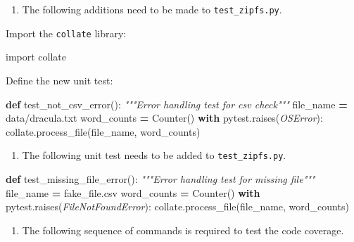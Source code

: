 \documentclass[
]{krantz}
\makeatletter
\newenvironment{Shaded}{\begin{snugshade}}{\end{snugshade}}
\newcommand{\CommentTok}[1]{\textcolor[rgb]{0.56,0.35,0.01}{\textit{#1}}}
\newcommand{\ControlFlowTok}[1]{\textcolor[rgb]{0.13,0.29,0.53}{\textbf{#1}}}
\newcommand{\ImportTok}[1]{#1}
\newcommand{\KeywordTok}[1]{\textcolor[rgb]{0.13,0.29,0.53}{\textbf{#1}}}
\newcommand{\NormalTok}[1]{#1}
\newcommand{\OperatorTok}[1]{\textcolor[rgb]{0.81,0.36,0.00}{\textbf{#1}}}
\newcommand{\PreprocessorTok}[1]{\textcolor[rgb]{0.56,0.35,0.01}{\textit{#1}}}
\newcommand{\StringTok}[1]{\textcolor[rgb]{0.31,0.60,0.02}{#1}}
\providecommand{\tightlist}{%
  \setlength{\itemsep}{0pt}\setlength{\parskip}{0pt}}
\newenvironment{kframe}{%
\medskip{}
\setlength{\fboxsep}{.8em}
 \def\at@end@of@kframe{}%
 \ifinner\ifhmode%
  \def\at@end@of@kframe{\end{minipage}}%
  \begin{minipage}{\columnwidth}%
 \fi\fi%
 \def\FrameCommand##1{\hskip\@totalleftmargin \hskip-\fboxsep
 \colorbox{shadecolor}{##1}\hskip-\fboxsep
     \hskip-\linewidth \hskip-\@totalleftmargin \hskip\columnwidth}%
 \MakeFramed {\advance\hsize-\width
   \@totalleftmargin\z@ \linewidth\hsize
   \@setminipage}}%
 {\par\unskip\endMakeFramed%
 \at@end@of@kframe}
\renewenvironment{Shaded}{\begin{kframe}}{\end{kframe}}
\makeatother
\begin{document}
\begin{enumerate}
\def\labelenumi{\arabic{enumi}.}
\setcounter{enumi}{1}
\tightlist
\item
  The following additions need to be made to \texttt{test\_zipfs.py}.
\end{enumerate}

Import the \texttt{collate} library:

\begin{Shaded}
\begin{Highlighting}[]
\ImportTok{import}\NormalTok{ collate}
\end{Highlighting}
\end{Shaded}

Define the new unit test:

\begin{Shaded}
\begin{Highlighting}[]
\KeywordTok{def}\NormalTok{ test\_not\_csv\_error():}
    \CommentTok{"""Error handling test for csv check"""}
\NormalTok{    file\_name }\OperatorTok{=} \StringTok{\textquotesingle{}data/dracula.txt\textquotesingle{}}
\NormalTok{    word\_counts }\OperatorTok{=}\NormalTok{ Counter()}
    \ControlFlowTok{with}\NormalTok{ pytest.raises(}\PreprocessorTok{OSError}\NormalTok{):}
\NormalTok{        collate.process\_file(file\_name, word\_counts)}
\end{Highlighting}
\end{Shaded}

\begin{enumerate}
\def\labelenumi{\arabic{enumi}.}
\setcounter{enumi}{2}
\tightlist
\item
  The following unit test needs to be added to \texttt{test\_zipfs.py}.
\end{enumerate}

\begin{Shaded}
\begin{Highlighting}[]
\KeywordTok{def}\NormalTok{ test\_missing\_file\_error():}
    \CommentTok{"""Error handling test for missing file"""}
\NormalTok{    file\_name }\OperatorTok{=} \StringTok{\textquotesingle{}fake\_file.csv\textquotesingle{}}
\NormalTok{    word\_counts }\OperatorTok{=}\NormalTok{ Counter()}
    \ControlFlowTok{with}\NormalTok{ pytest.raises(}\PreprocessorTok{FileNotFoundError}\NormalTok{):}
\NormalTok{        collate.process\_file(file\_name, word\_counts)}
\end{Highlighting}
\end{Shaded}

\begin{enumerate}
\def\labelenumi{\arabic{enumi}.}
\setcounter{enumi}{3}
\tightlist
\item
  The following sequence of commands is required to test the code coverage.
\end{enumerate}
\end{document}
